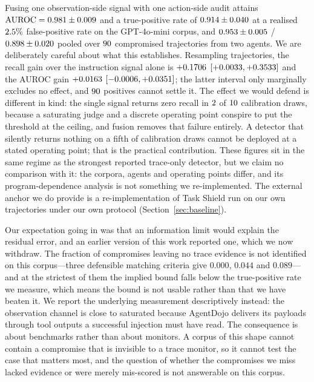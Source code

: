 \documentclass[pdflatex,sn-basic]{sn-jnl}%
\theoremstyle{thmstyleone}
\theoremstyle{thmstyletwo}
\theoremstyle{thmstylethree}
\begin{document}
Fusing one observation-side signal with one action-side audit attains
$\mathrm{AUROC} = 0.981 \pm 0.009$ and a true-positive rate of
$0.914 \pm 0.040$ at a realised $2.5\%$ false-positive rate on
the GPT-4o-mini corpus, and $0.953 \pm 0.005$ /
$0.898 \pm 0.020$ pooled over $90$ compromised trajectories from
two agents. We are deliberately careful about what this establishes. Resampling
trajectories, the recall gain over the instruction signal alone is $+0.1706$
$[+0.0033, +0.3533]$ and the AUROC gain $+0.0163$
$[-0.0006, +0.0351]$; the latter interval only marginally excludes
no effect, and $90$ positives cannot settle it. The effect we would defend is
different in kind: the single signal returns zero recall in
$2$ of $10$ calibration draws, because a saturating judge and a
discrete operating point conspire to put the threshold at the ceiling, and fusion
removes that failure entirely. A detector that silently returns nothing on a fifth
of calibration draws cannot be deployed at a stated operating point; that is the
practical contribution. These figures sit in the same regime as the strongest
reported trace-only detector, but we claim no comparison with it: the corpora,
agents and operating points differ, and its program-dependence analysis is not
something we re-implemented. The external anchor we do provide is a
re-implementation of Task Shield run on our own trajectories under our own
protocol (Section~\ref{sec:baseline}).

Our expectation going in was that an information limit would explain the residual
error, and an earlier version of this work reported one, which we now withdraw.
The fraction of compromises leaving no trace evidence is not identified on this
corpus---three defensible matching criteria give $0.000$, $0.044$ and $0.089$---and
at the strictest of them the implied bound falls below the true-positive rate we
measure, which means the bound is not usable rather than that we have beaten it. We
report the underlying measurement descriptively instead: the observation channel is
close to saturated because AgentDojo delivers its payloads through tool outputs a
successful injection must have read. The consequence is about benchmarks rather
than about monitors. A corpus of this shape cannot contain a compromise that is
invisible to a trace monitor, so it cannot test the case that matters most, and the
question of whether the compromises we miss lacked evidence or were merely
mis-scored is not answerable on this corpus.
\end{document}
